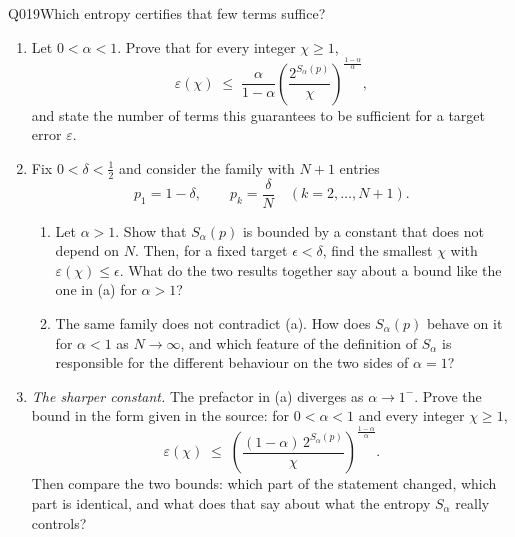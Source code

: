 \begin{entry}{Q019}{Which entropy certifies that few terms suffice?}
\begin{problem}
\begin{enumerate}[label=\textbf{(\alph*)},leftmargin=*]
  \item Let $0<\alpha<1$. Prove that for every integer $\chi\ge 1$,
        \[
          \varepsilon(\chi)\;\le\;\frac{\alpha}{1-\alpha}
          \left(\frac{2^{S_\alpha(p)}}{\chi}\right)^{\frac{1-\alpha}{\alpha}} ,
        \]
        and state the number of terms this guarantees to be sufficient for a target
        error $\varepsilon$.
  \item Fix $0<\delta<\tfrac12$ and consider the family with $N+1$ entries
        \[
          p_1 = 1-\delta, \qquad p_k=\frac{\delta}{N}\quad (k=2,\dots,N+1).
        \]
        \begin{enumerate}[label=(\roman*)]
          \item Let $\alpha>1$. Show that $S_\alpha(p)$ is bounded by a constant that
                does not depend on $N$. Then, for a fixed target $\epsilon<\delta$,
                find the smallest $\chi$ with $\varepsilon(\chi)\le\epsilon$. What do
                the two results together say about a bound like the one in (a) for
                $\alpha>1$?
          \item The same family does not contradict (a). How does $S_\alpha(p)$ behave
                on it for $\alpha<1$ as $N\to\infty$, and which feature of the
                definition of $S_\alpha$ is responsible for the different behaviour on
                the two sides of $\alpha=1$?

        \end{enumerate}

    \item \emph{The sharper constant.} The prefactor in (a) diverges as $\alpha\to1^-$.
        Prove the bound in the form given in the source: for $0<\alpha<1$ and every
        integer $\chi\ge1$,
        \[
          \varepsilon(\chi)\;\le\;
          \left(\frac{(1-\alpha)\,2^{S_\alpha(p)}}{\chi}\right)^{\frac{1-\alpha}{\alpha}} .
        \]
        Then compare the two bounds: which part of the statement changed, which part
        is identical, and what does that say about what the entropy $S_\alpha$ really
        controls?
\end{enumerate}
\end{problem}

\begin{solution}[a]


\end{solution}
\end{entry}
